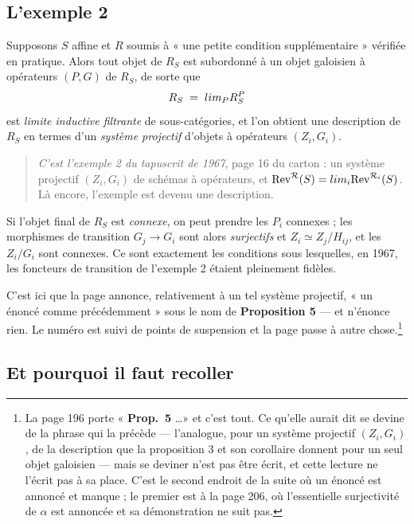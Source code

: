 \documentclass[11pt,a4paper]{article}
\begin{document}
\subsection*{L'exemple 2}

Supposons $S$ affine et $R$ soumis à « une petite condition supplémentaire »
vérifiée en pratique. Alors tout objet de $R_{S}$ est subordonné à un objet
galoisien à opérateurs $(P, G)$ de $R_{S}$, de sorte que
\[
  R_{S} \;=\; \varinjlim_{P} R^{P}_{S}
\]
est \emph{limite inductive filtrante} de sous-catégories, et l'on obtient une
description de $R_{S}$ en termes d'un \emph{système projectif} d'objets à
opérateurs $(Z_{i}, G_{i})$.

\begin{quote}
\emph{C'est l'exemple 2 du tapuscrit de 1967}, page 16 du carton : un système
projectif $(Z_{i}, G_{i})$ de schémas à opérateurs, et
$\mathrm{Rev}^{\mathcal{R}}(S) = \varinjlim_{i}
\mathrm{Rev}^{\mathcal{R}_{i}}(S)$. Là encore, l'exemple est devenu une
description.
\end{quote}

Si l'objet final de $R_{S}$ est \emph{connexe}, on peut prendre les $P_{i}$
connexes ; les morphismes de transition $G_{j} \to G_{i}$ sont alors
\emph{surjectifs} et $Z_{i} \simeq Z_{j}/H_{ij}$, et les $Z_{i}/G_{i}$ sont
connexes. Ce sont exactement les conditions sous lesquelles, en 1967, les
foncteurs de transition de l'exemple 2 étaient pleinement fidèles.

C'est ici que la page annonce, relativement à un tel système projectif, « un
énoncé comme précédemment » sous le nom de \textbf{Proposition 5} --- et
n'énonce rien. Le numéro est suivi de points de suspension et la page passe à
autre chose.\footnote{La page 196 porte « \textbf{Prop.\ 5} \dots » et
c'est tout. Ce qu'elle aurait dit se devine de la phrase qui la précède ---
l'analogue, pour un système projectif $(Z_i, G_i)$, de la description que la
proposition 3 et son corollaire donnent pour un seul objet galoisien --- mais
se deviner n'est pas être écrit, et cette lecture ne l'écrit pas à sa place.
C'est le second endroit de la suite où un énoncé est annoncé et manque ; le
premier est à la page 206, où l'essentielle surjectivité de $\alpha$ est
annoncée et sa démonstration ne suit pas.}

\subsection*{Et pourquoi il faut recoller}
\end{document}
